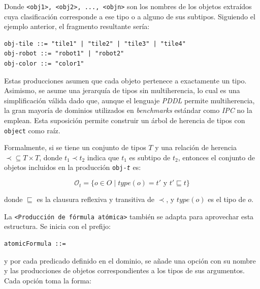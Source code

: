 Donde \texttt{<obj1>, <obj2>, ..., <objn>} son los nombres de los objetos extraídos cuya clasificación corresponde a ese tipo o a alguno de sus subtipos. Siguiendo el ejemplo anterior, el fragmento resultante sería:

\begin{tcolorbox}[colback=white, colframe=gray, title=Ejemplo de producciones por tipo, fonttitle=\bfseries, breakable]
\small
\begin{verbatim}
obj-tile ::= "tile1" | "tile2" | "tile3" | "tile4"
obj-robot ::= "robot1" | "robot2"
obj-color ::= "color1"
\end{verbatim}
\end{tcolorbox}

Estas producciones asumen que cada objeto pertenece a exactamente un tipo. Asimismo, se asume una jerarquía de tipos sin multiherencia, lo cual es una simplificación válida dado que, aunque el lenguaje \textit{PDDL} permite multiherencia, la gran mayoría de dominios utilizados en \textit{benchmarks} estándar como \textit{IPC} no la emplean. Esta suposición permite construir un árbol de herencia de tipos con \texttt{object} como raíz.

Formalmente, si se tiene un conjunto de tipos \( T \) y una relación de herencia \( \prec \subseteq T \times T \), donde \( t_1 \prec t_2 \) indica que \( t_1 \) es subtipo de \( t_2 \), entonces el conjunto de objetos incluidos en la producción \texttt{obj-\textit{t}} es:

\[
\mathcal{O}_t = \{ o \in O \mid type(o) = t' \text{ y } t' \sqsubseteq t \}
\]

donde \( \sqsubseteq \) es la clausura reflexiva y transitiva de \( \prec \), y \( type(o) \) es el tipo de \( o \).

\vspace{1em}
La \texttt{<Producción de fórmula atómica>} también se adapta para aprovechar esta estructura. Se inicia con el prefijo:

\begin{tcolorbox}[colback=blue!5!white, colframe=blue!75!black, title=Estructura general de \texttt{atomicFormula}, fonttitle=\bfseries, breakable]
\small
\begin{verbatim}
atomicFormula ::= 
\end{verbatim}
\end{tcolorbox}

y por cada predicado definido en el dominio, se añade una opción con su nombre y las producciones de objetos correspondientes a los tipos de sus argumentos. Cada opción toma la forma:


